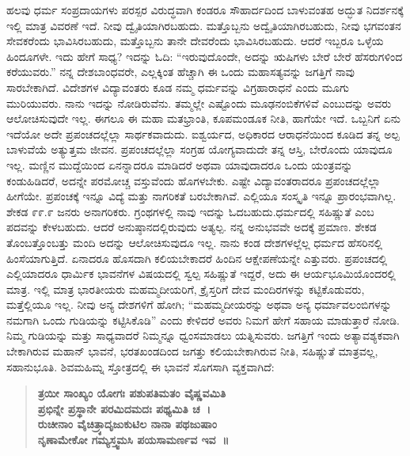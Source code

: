 ಹಲವು ಧರ್ಮ ಸಂಪ್ರದಾಯಗಳು ಪರಸ್ಪರ ವಿರುದ್ಧವಾಗಿ ಕಂಡರೂ ಸೌಹಾರ್ದದಿಂದ ಬಾಳುವಂತಹ ಅದ್ಭುತ ನಿದರ್ಶನಕ್ಕೆ ಇಲ್ಲಿ ಮಾತ್ರ ವಿವರಣೆ ಇದೆ. ನೀವು ದ್ವೈತಿಯಾಗಿರಬಹುದು. ಮತ್ತೊಬ್ಬನು ಅದ್ವೈತಿಯಾಗಿರಬಹುದು, ನೀವು ಭಗವಂತನ ಸೇವಕರೆಂದು ಭಾವಿಸಿರಬಹುದು, ಮತ್ತೊಬ್ಬನು ತಾನೇ ದೇವರೆಂದು ಭಾವಿಸಿರಬಹುದು. ಆದರೆ ಇಬ್ಬರೂ ಒಳ್ಳೆಯ ಹಿಂದೂಗಳೇ. ಇದು ಹೇಗೆ ಸಾಧ್ಯ? ಇದನ್ನು ಓದಿ: “ಇರುವುದೊಂದೇ, ಅದನ್ನು ಋಷಿಗಳು ಬೇರೆ ಬೇರೆ ಹೆಸರುಗಳಿಂದ ಕರೆಯುವರು.” ನನ್ನ ದೇಶಬಾಂಧವರೇ, ಎಲ್ಲಕ್ಕಿಂತ ಹೆಚ್ಚಾಗಿ ಈ ಒಂದು ಮಹಾಸತ್ಯವನ್ನು ಜಗತ್ತಿಗೆ ನಾವು ಸಾರಬೇಕಾಗಿದೆ. ವಿದೇಶಗಳ ವಿದ್ಯಾವಂತರು ಕೂಡ ನಮ್ಮ ಧರ್ಮವನ್ನು ವಿಗ್ರಹಾರಾಧನೆ ಎಂದು ಮೂಗು ಮುರಿಯುವರು. ನಾನು ಇದನ್ನು ನೋಡಿರುವೆನು. ತಮ್ಮಲ್ಲೇ ಎಷ್ಟೊಂದು ಮೂಢನಂಬಿಕೆಗಳಿವೆ ಎಂಬುದನ್ನು ಅವರು ಆಲೋಚಿಸುವುದೇ ಇಲ್ಲ. ಈಗಲೂ ಈ ಮಹಾ ಮತಭ್ರಾಂತಿ, ಕೂಪಮಂಡೂಕ ನೀತಿ, ಹಾಗೆಯೇ ಇದೆ. ಒಬ್ಬನಿಗೆ ಏನು ಇದೆಯೋ ಅದೇ ಪ್ರಪಂಚದಲ್ಲೆಲ್ಲಾ ಸಾರ್ಥಕವಾದುದು. ಐಶ್ವರ್ಯದ, ಅಧಿಕಾರದ ಆರಾಧನೆಯಿಂದ ಕೂಡಿದ ತನ್ನ ಅಲ್ಪ ಬಾಳುವೆಯೆ ಅತ್ಯುತ್ತಮ ಜೀವನ. ಪ್ರಪಂಚದಲ್ಲೆಲ್ಲಾ ಸಂಗ್ರಹ ಯೋಗ್ಯವಾದುದೇ ತನ್ನ ಆಸ್ತಿ, ಬೇರೊಂದು ಯಾವುದೂ ಇಲ್ಲ. ಮಣ್ಣಿನ ಮುದ್ದೆಯಿಂದ ಏನನ್ನಾದರೂ ಮಾಡಿದರೆ ಅಥವಾ ಯಾವುದಾದರೂ ಒಂದು ಯಂತ್ರವನ್ನು ಕಂಡುಹಿಡಿದರೆ, ಅದನ್ನೇ ಪರಮೋಚ್ಚ ವಸ್ತುವೆಂದು ಹೊಗಳಬೇಕು. ಎಷ್ಟೇ ವಿದ್ಯಾವಂತ\-ರಾದರೂ ಪ್ರಪಂಚದಲ್ಲೆಲ್ಲಾ ಹೀಗೆಯೇ. ಪ್ರಪಂಚಕ್ಕೆ ಇನ್ನೂ ವಿದ್ಯೆ ಮತ್ತು ನಾಗರಿಕತೆ ಬರಬೇಕಾಗಿವೆ. ಎಲ್ಲಿಯೂ ಸಂಸ್ಕೃತಿ ಇನ್ನೂ ಪ್ರಾರಂಭವಾಗಿಲ್ಲ. ಶೇಕಡ ೯೯.೯ ಜನರು ಅನಾಗರಿಕರು. ಗ್ರಂಥಗಳಲ್ಲಿ ನಾವು ಇದನ್ನು ಓದಬಹುದು.\break ಧರ್ಮದಲ್ಲಿ ಸಹಿಷ್ಣುತೆ ಎಂಬ ಪದವನ್ನು ಕೇಳಬಹುದು. ಆದರೆ ಅನುಷ್ಠಾನದಲ್ಲಿರುವುದು ಅತ್ಯಲ್ಪ. ನನ್ನ ಅನುಭವವೇ ಅದಕ್ಕೆ ಪ್ರಮಾಣ. ಶೇಕಡ ತೊಂಬತ್ತೊಂಬತ್ತು ಮಂದಿ ಅದನ್ನು ಆಲೋಚಿಸುವುದೂ ಇಲ್ಲ. ನಾನು ಕಂಡ ದೇಶಗಳಲ್ಲೆಲ್ಲ ಧರ್ಮದ ಹೆಸರಿನಲ್ಲಿ ಹಿಂಸೆಯಾಗುತ್ತಿದೆ. ಏನಾದರೂ ಹೊಸದಾಗಿ ಕಲಿಯಬೇಕಾದರೆ ಹಿಂದಿನ ಆಕ್ಷೇಪಣೆಯನ್ನೇ ಎತ್ತುವರು. ಪ್ರಪಂಚದಲ್ಲಿ ಎಲ್ಲಿಯಾದರೂ ಧಾರ್ಮಿಕ ಭಾವನೆಗಳ ವಿಷಯದಲ್ಲಿ ಸ್ವಲ್ಪ ಸಹಿಷ್ಣುತೆ ಇದ್ದರೆ, ಅದು ಈ ಆರ್ಯಭೂಮಿಯೊಂದರಲ್ಲಿ ಮಾತ್ರ. ಇಲ್ಲಿ ಮಾತ್ರ ಭಾರತೀಯರು ಮಹಮ್ಮದೀಯರಿಗೆ, ಕ್ರೈಸ್ತರಿಗೆ ದೇವ ಮಂದಿರಗಳನ್ನು ಕಟ್ಟಿಕೊಡುವರು, ಮತ್ತೆಲ್ಲಿಯೂ ಇಲ್ಲ. ನೀವು ಅನ್ಯ ದೇಶಗಳಿಗೆ ಹೋಗಿ; “ಮಹಮ್ಮದೀಯರನ್ನು ಅಥವಾ ಅನ್ಯ ಧರ್ಮಾವಲಂಬಿಗಳನ್ನು ನಮಗಾಗಿ ಒಂದು ಗುಡಿಯನ್ನು ಕಟ್ಟಿಸಿಕೊಡಿ” ಎಂದು ಕೇಳಿದರೆ ಅವರು ನಿಮಗೆ ಹೇಗೆ ಸಹಾಯ ಮಾಡುತ್ತಾರೆ ನೋಡಿ. ನಿಮ್ಮ ಗುಡಿಯನ್ನು ಮತ್ತು ಸಾಧ್ಯವಾದರೆ ನಿಮ್ಮನ್ನೂ ಧ್ವಂಸಮಾಡಲು ಯತ್ನಿಸುವರು. ಜಗತ್ತಿಗೆ ಇಂದು ಅತ್ಯಾವಶ್ಯಕವಾಗಿ ಬೇಕಾಗಿರುವ ಮಹಾನ್ ಭಾವನೆ, ಭರತಖಂಡದಿಂದ ಜಗತ್ತು ಕಲಿಯಬೇಕಾಗಿರುವ ನೀತಿ, ಸಹಿಷ್ಣುತೆ ಮಾತ್ರವಲ್ಲ, ಸಹಾನುಭೂತಿ. ಶಿವಮಹಿಮ್ನ ಸ್ತೋತ್ರದಲ್ಲಿ ಈ ಭಾವನೆ ಸೊಗಸಾಗಿ ವ್ಯಕ್ತವಾಗಿದೆ:

\begin{verse}
\textbf{ತ್ರಯೀ ಸಾಂಖ್ಯಂ ಯೋಗಃ ಪಶುಪತಿಮತಂ ವೈಷ್ಣವಮಿತಿ}\\\textbf{ಪ್ರಭಿನ್ನೇ ಪ್ರಸ್ಥಾನೇ ಪರಮಿದಮದಃ ಪಥ್ಯಮಿತಿ ಚ~।}\\\textbf{ರುಚೀನಾಂ ವೈಚಿತ್ರ್ಯಾದೃಜುಕುಟಿಲ ನಾನಾ ಪಥಜುಷಾಂ}\\\textbf{ನೃಣಾಮೇಕೋ ಗಮ್ಯಸ್ತ್ವಮಸಿ ಪಯಸಾಮರ್ಣವ ಇವ~॥}
\end{verse}

